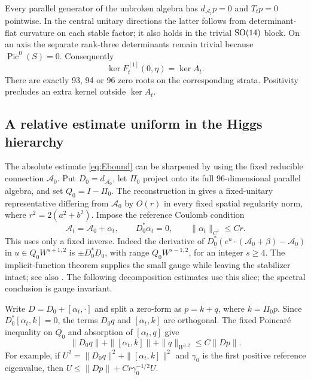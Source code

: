 Every parallel generator of the unbroken algebra has
$d_{\mathcal A_t}p=0$ and $T_tp=0$ pointwise. In the central
unitary directions the latter follows from determinant-flat
curvature on each stable factor; it also holds in the trivial
$\operatorname{SO}(14)$ block. On an axis the separate rank-three determinants
remain trivial because $\operatorname{Pic}^0(S)=0$.
Consequently
\begin{equation}\label{eq:kernel}
 \ker F_t^{[1]}(0,\eta)=\ker A_t.
\end{equation}
There are exactly 93, 94 or 96 zero roots on the corresponding
strata. Positivity precludes an extra kernel outside $\ker A_t$.

\subsection{A relative estimate uniform in the Higgs hierarchy}
The absolute estimate \eqref{eq:Ebound} can be sharpened by using
the fixed reducible connection $\mathcal A_0$. Put
$D_0=d_{\mathcal A_0}$, let $\Pi_0$ project onto its full
96-dimensional parallel algebra, and set $Q_0=I-\Pi_0$.
The reconstruction in \cite[Lemmas~2.1--2.2 and section~3.2]{wuebben15}
gives a fixed-unitary representative differing from $\mathcal A_0$
by $O(r)$ in every fixed spatial regularity norm, where
$r^2=2(a^2+b^2)$. Impose the reference Coulomb condition
\begin{equation}\label{eq:fixedcoulomb}
 \mathcal A_t=\mathcal A_0+\alpha_t,\qquad
 D_0^*\alpha_t=0,\qquad \|\alpha_t\|_{C^1}\le Cr.
\end{equation}
This uses only a fixed inverse. Indeed the derivative of
$D_0^*(e^u\cdot(\mathcal A_0+\beta)-\mathcal A_0)$ in
$u\in Q_0W^{s+1,2}$ is $\pm D_0^*D_0$, with range
$Q_0W^{s-1,2}$, for an integer $s\ge4$. The implicit-function
theorem supplies the small gauge while leaving the stabilizer
intact; see also \cite[Proposition~3.4]{feehan}. The following
decomposition estimates use this slice; the spectral conclusion
is gauge invariant.

Write $D=D_0+[\alpha_t,\cdot]$ and split a zero-form as
$p=k+q$, where $k=\Pi_0p$. Since
$D_0^*[\alpha_t,k]=0$, the terms $D_0q$ and $[\alpha_t,k]$
are orthogonal. The fixed Poincar\'e inequality on $Q_0$ and
absorption of $[\alpha_t,q]$ give
\begin{equation}\label{eq:fixedenergy}
 \|D_0q\|+\|[\alpha_t,k]\|+\|q\|_{W^{1,2}}
                   \le C\|Dp\|.
\end{equation}
For example, if $U^2=\|D_0q\|^2+\|[\alpha_t,k]\|^2$ and
$\gamma_0$ is the first positive reference eigenvalue, then
$U\le\|Dp\|+Cr\gamma_0^{-1/2}U$.


